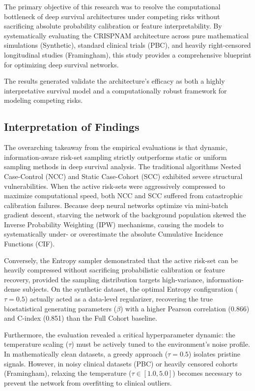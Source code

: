 \documentclass[a4paper,twoside,12pt]{report}
\begin{document}
The primary objective of this research was to resolve the computational bottleneck of deep survival architectures under competing risks without sacrificing absolute probability calibration or feature interpretability. By systematically evaluating the CRISPNAM architecture across pure mathematical simulations (Synthetic), standard clinical trials (PBC), and heavily right-censored longitudinal studies (Framingham), this study provides a comprehensive blueprint for optimizing deep survival networks. 

The results generated validate the architecture's efficacy as both a highly interpretative survival model and a computationally robust framework for modeling competing risks.

\subsection{Interpretation of Findings}

The overarching takeaway from the empirical evaluations is that dynamic, information-aware risk-set sampling strictly outperforms static or uniform sampling methods in deep survival analysis. The traditional algorithms Nested Case-Control (NCC) and Static Case-Cohort (SCC) exhibited severe structural vulnerabilities. When the active risk-sets were aggressively compressed to maximize computational speed, both NCC and SCC suffered from catastrophic calibration failures. Because deep neural networks optimize via mini-batch gradient descent, starving the network of the background population skewed the Inverse Probability Weighting (IPW) mechanisms, causing the models to systematically under- or overestimate the absolute Cumulative Incidence Functions (CIF).

Conversely, the Entropy sampler demonstrated that the active risk-set can be heavily compressed without sacrificing probabilistic calibration or feature recovery, provided the sampling distribution targets high-variance, information-dense subjects. On the synthetic dataset, the optimal Entropy configuration ($\tau=0.5$) actually acted as a data-level regularizer, recovering the true biostatistical generating parameters ($\beta$) with a higher Pearson correlation (0.866) and C-index (0.851) than the Full Cohort baseline. 

Furthermore, the evaluation revealed a critical hyperparameter dynamic: the temperature scaling ($\tau$) must be actively tuned to the environment's noise profile. In mathematically clean datasets, a greedy approach ($\tau=0.5$) isolates pristine signals. However, in noisy clinical datasets (PBC) or heavily censored cohorts (Framingham), relaxing the temperature ($\tau \in [1.0, 5.0]$) becomes necessary to prevent the network from overfitting to clinical outliers. 
\end{document}
